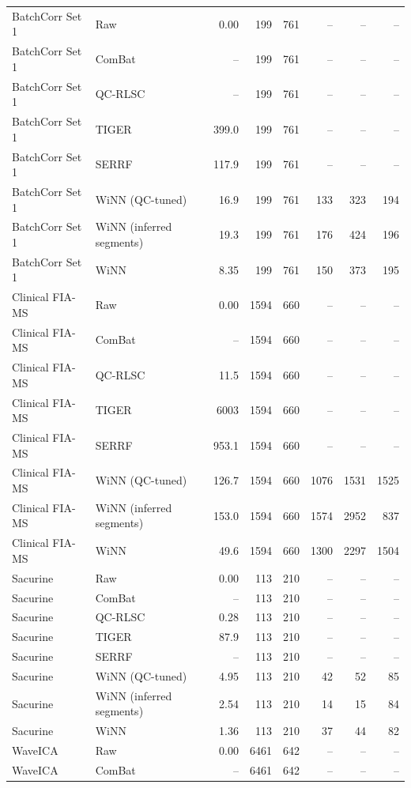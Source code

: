 \begin{landscape}
\begin{longtable}{llrrrrrr}
BatchCorr Set 1 & Raw & 0.00 & 199 & 761 & -- & -- & -- \\
BatchCorr Set 1 & ComBat & -- & 199 & 761 & -- & -- & -- \\
BatchCorr Set 1 & QC-RLSC & -- & 199 & 761 & -- & -- & -- \\
BatchCorr Set 1 & TIGER & 399.0 & 199 & 761 & -- & -- & -- \\
BatchCorr Set 1 & SERRF & 117.9 & 199 & 761 & -- & -- & -- \\
BatchCorr Set 1 & WiNN (QC-tuned) & 16.9 & 199 & 761 & 133 & 323 & 194 \\
BatchCorr Set 1 & WiNN (inferred segments) & 19.3 & 199 & 761 & 176 & 424 & 196 \\
BatchCorr Set 1 & WiNN & 8.35 & 199 & 761 & 150 & 373 & 195 \\
Clinical FIA-MS & Raw & 0.00 & 1594 & 660 & -- & -- & -- \\
Clinical FIA-MS & ComBat & -- & 1594 & 660 & -- & -- & -- \\
Clinical FIA-MS & QC-RLSC & 11.5 & 1594 & 660 & -- & -- & -- \\
Clinical FIA-MS & TIGER & 6003 & 1594 & 660 & -- & -- & -- \\
Clinical FIA-MS & SERRF & 953.1 & 1594 & 660 & -- & -- & -- \\
Clinical FIA-MS & WiNN (QC-tuned) & 126.7 & 1594 & 660 & 1076 & 1531 & 1525 \\
Clinical FIA-MS & WiNN (inferred segments) & 153.0 & 1594 & 660 & 1574 & 2952 & 837 \\
Clinical FIA-MS & WiNN & 49.6 & 1594 & 660 & 1300 & 2297 & 1504 \\
Sacurine & Raw & 0.00 & 113 & 210 & -- & -- & -- \\
Sacurine & ComBat & -- & 113 & 210 & -- & -- & -- \\
Sacurine & QC-RLSC & 0.28 & 113 & 210 & -- & -- & -- \\
Sacurine & TIGER & 87.9 & 113 & 210 & -- & -- & -- \\
Sacurine & SERRF & -- & 113 & 210 & -- & -- & -- \\
Sacurine & WiNN (QC-tuned) & 4.95 & 113 & 210 & 42 & 52 & 85 \\
Sacurine & WiNN (inferred segments) & 2.54 & 113 & 210 & 14 & 15 & 84 \\
Sacurine & WiNN & 1.36 & 113 & 210 & 37 & 44 & 82 \\
WaveICA & Raw & 0.00 & 6461 & 642 & -- & -- & -- \\
WaveICA & ComBat & -- & 6461 & 642 & -- & -- & -- \\

\end{longtable}
\end{landscape}

